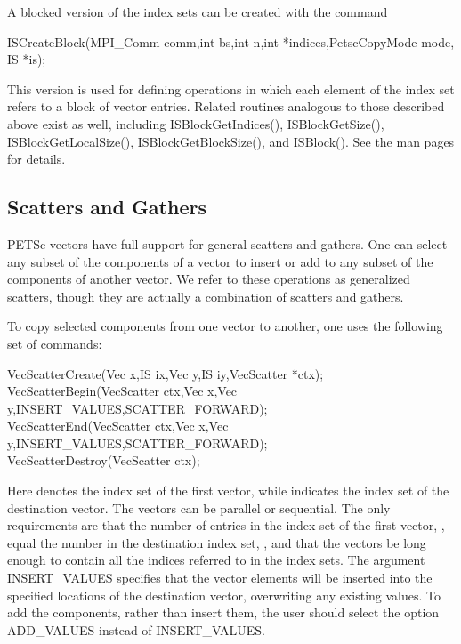A blocked version of the index sets can be created with the command
\begin{tabbing}
  ISCreateBlock(MPI\_Comm comm,int bs,int n,int *indices,PetscCopyMode mode, IS *is);
\end{tabbing}
This version is used for defining operations in which each element of the index
set refers to a block of  vector entries.  Related routines analogous
to those described above exist as well, including
ISBlockGetIndices(), ISBlockGetSize(), ISBlockGetLocalSize(), ISBlockGetBlockSize(),
and ISBlock(). See the man pages for details.

\subsection{Scatters and Gathers}  
\label{sec_scatter}

PETSc vectors have full support for general scatters and 
gathers. One can select any subset of the components of a vector to
insert or add to any subset of the components of another vector.
We refer to these operations as generalized scatters, though they are 
actually a combination of scatters and gathers. 

 
To copy selected components from one vector 
to another, one uses the following set of commands:
\begin{tabbing}
  VecScatterCreate(Vec x,IS ix,Vec y,IS iy,VecScatter *ctx);\\
  VecScatterBegin(VecScatter ctx,Vec x,Vec y,INSERT_VALUES,SCATTER_FORWARD);\\
  VecScatterEnd(VecScatter ctx,Vec x,Vec y,INSERT_VALUES,SCATTER_FORWARD);\\
  VecScatterDestroy(VecScatter ctx);
\end{tabbing} 
Here  denotes the index set of the first vector, while  indicates the index set of the destination vector.  The vectors
can be parallel or sequential. The only requirements are that the
number of entries in the index set of the first vector, ,
equal the number in the destination index set, , and that the
vectors be long enough to contain all the indices referred to in the
index sets.  The argument INSERT_VALUES specifies that the
vector elements will be inserted into the specified locations of the
destination vector, overwriting any existing values.  To add the
components, rather than insert them, the user should select the option
ADD_VALUES instead of INSERT_VALUES.

